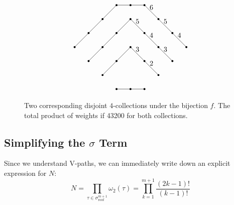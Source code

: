 \documentclass[11pt]{article}
\theoremstyle{mythm}
\begin{document}
\begin{figure}[h!]
\begin{equation*}
\begin{tikzpicture}[scale=0.70]
	\node at (3,1) [circle, fill, inner sep=1pt]{};
	\node at (4,1) [circle, fill, inner sep=1pt]{};
	\node at (5,1) [circle, fill, inner sep=1pt]{};
	\draw (3,1) -- (5,1);
	
	\node at (2,2) [circle, fill, inner sep=1pt]{};
	\node at (3,3) [circle, fill, inner sep=1pt]{};
	\node at (4,4) [circle, fill, inner sep=1pt]{};
	\node at (5,3) [circle, fill, inner sep=1pt]{};
	\node at (6,2) [circle, fill, inner sep=1pt]{};
	\draw (2,2) -- (3,3) -- (4,4);
	\draw (4,4) -- node[above] {3} (5,3);
	\draw (5,3) -- node[above] {2} (6,2);
	
	\node at (1,3) [circle, fill, inner sep=1pt]{};
	\node at (2,4) [circle, fill, inner sep=1pt]{};
	\node at (3,5) [circle, fill, inner sep=1pt]{};
	\node at (4,6) [circle, fill, inner sep=1pt]{};
	\node at (5,5) [circle, fill, inner sep=1pt]{};
	\node at (6,4) [circle, fill, inner sep=1pt]{};
	\node at (7,3) [circle, fill, inner sep=1pt]{};
	\draw (1,3) -- (2,4) -- (3,5) -- (4,6);
	\draw (4,6) -- node[above] {5} (5,5);
	\draw (5,5) -- node[above] {4} (6,4);
	\draw (6,4) -- node[above] {3} (7,3);
	
	\node at (0,4) [circle, fill, inner sep=1pt]{};
	\node at (1,5) [circle, fill, inner sep=1pt]{};
	\node at (2,6) [circle, fill, inner sep=1pt]{};
	\node at (3,7) [circle, fill, inner sep=1pt]{};
	\node at (4,7) [circle, fill, inner sep=1pt]{};
	\node at (5,7) [circle, fill, inner sep=1pt]{};
	\node at (6,6) [circle, fill, inner sep=1pt]{};
	\node at (7,5) [circle, fill, inner sep=1pt]{};
	\node at (8,4) [circle, fill, inner sep=1pt]{};
	\draw (0,4) -- (1,5) -- (2,6) -- (3,7) -- (4,7) -- (5,7);
	\draw (5,7) -- node[above] {6} (6,6);
	\draw (6,6) -- node[above] {5} (7,5);
	\draw (7,5) -- node[above] {4} (8,4);

\end{tikzpicture}
\end{equation*}
\caption{\label{fig:43200} Two corresponding disjoint $4$-collections under the bijection $f$. The total product of weights if 43200 for both collections.}
\end{figure}

\subsection{Simplifying the $\sigma$ Term}

Since we understand V-paths, we can immediately write down an explicit expression for $N$:
\begin{equation*}
N = \prod\limits_{\tau\in\sigma_{\text{roof}}^{m+1}}\omega_2(\tau) = \prod\limits_{k=1}^{m+1}\frac{(2k-1)!}{(k-1)!}
\end{equation*}
\end{document}
